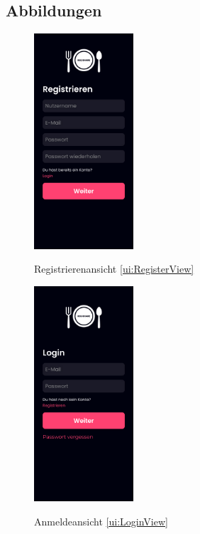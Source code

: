 \documentclass[parskip=full]{scrartcl}
\begin{document}
\subsection*{Abbildungen}
\begin{figure}[htp]
    \begin{minipage}
        [t]{0.49\textwidth}
        \centering
        \includegraphics[height=80mm]{images/ui/RegisterView.jpg}
        \label{fig:RegisterView}
        \caption{Registrierenansicht \ref{ui:RegisterView}}
    \end{minipage}
    \begin{minipage}
        [t]{0.49\textwidth}
        \centering
        \includegraphics[height=80mm]{images/ui/LoginView.jpg}
        \label{fig:LoginView}
        \caption{Anmeldeansicht \ref{ui:LoginView}}
    \end{minipage}
\end{figure}
\end{document}
